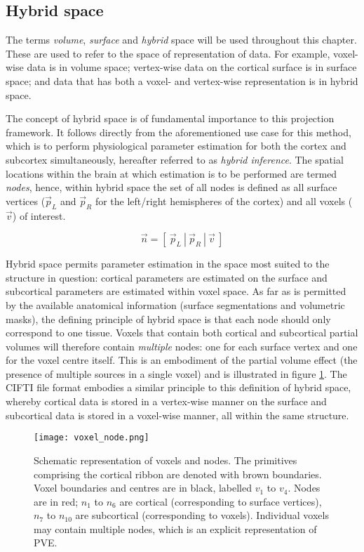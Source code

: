 \subsection{Hybrid space}

The terms \textit{volume}, \textit{surface} and \textit{hybrid} space will be used throughout this chapter. These are used to refer to the space of representation of data. For example, voxel-wise data is in volume space; vertex-wise data on the cortical surface is in surface space; and data that has both a voxel- and vertex-wise representation is in hybrid space. 

The concept of hybrid space is of fundamental importance to this projection framework. It follows directly from the aforementioned use case for this method, which is to perform physiological parameter estimation for both the cortex and subcortex simultaneously, hereafter referred to as \textit{hybrid inference}. The spatial locations within the brain at which estimation is to be performed are termed \textit{nodes}, hence, within hybrid space the set of all nodes is defined as all surface vertices ($\vec{p}_L$ and $\vec{p}_R$ for the left/right hemispheres of the cortex) and all voxels ($\vec{v}$) of interest. 

\begin{equation}
\vec{n} = [\ \vec{p}_L \ | \ \vec{p}_R \ | \ \vec{v} \ ] 
\end{equation} 

Hybrid space permits parameter estimation in the space most suited to the structure in question: cortical parameters are estimated on the surface and subcortical parameters are estimated within voxel space. As far as is permitted by the available anatomical information (surface segmentations and volumetric masks), the defining principle of hybrid space is that each node should only correspond to one tissue. Voxels that contain both cortical and subcortical partial volumes will therefore contain \textit{multiple} nodes: one for each surface vertex and one for the voxel centre itself. This is an embodiment of the partial volume effect (the presence of multiple sources in a single voxel) and is illustrated in figure \ref{voxel_node}. The CIFTI file format \cite{cifti} embodies a similar principle to this definition of hybrid space, whereby cortical data is stored in a vertex-wise manner on the surface and subcortical data is stored in a voxel-wise manner, all within the same structure.

\begin{figure}
\centering
\texttt{[image: voxel\_node.png]}
\caption{Schematic representation of voxels and nodes. The primitives comprising the cortical ribbon are denoted with brown boundaries. Voxel boundaries and centres are in black, labelled $v_1$ to $v_4$. Nodes are in red; $n_1$ to $n_6$ are cortical (corresponding to surface vertices), $n_7$ to $n_{10}$ are subcortical (corresponding to voxels). Individual voxels may contain multiple nodes, which is an explicit representation of PVE.}
\label{voxel_node} 
\end{figure}

